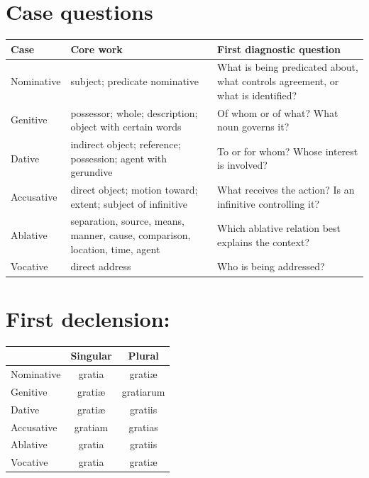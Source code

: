 \section{Case questions}



\begin{tabularx}{\linewidth}{@{}P{0.9in}P{1.7in}Y@{}}
  \toprule
  \textbf{Case} & \textbf{Core work} & \textbf{First diagnostic question} \\
  \midrule
  Nominative & subject; predicate nominative & What is being predicated about,
       what controls agreement, or what is identified? \\
  Genitive & possessor; whole; description; object with certain words & Of whom
             or of what? What noun governs it? \\
  Dative & indirect object; reference; possession; agent with gerundive & To or
           for whom? Whose interest is involved? \\
  Accusative & direct object; motion toward; extent; subject of infinitive &
               What receives the action? Is an infinitive controlling it? \\
  Ablative & separation, source, means, manner, cause, comparison, location,
             time, agent & Which ablative relation best explains the context? \\
  Vocative & direct address & Who is being addressed? \\
  \bottomrule
\end{tabularx}

\section{First declension: }

\begin{center}
\begin{tabular}{@{}lcc@{}}
  \toprule & \textbf{Singular} & \textbf{Plural} \\
  \midrule
  Nominative & gratia & gratiæ \\
  Genitive & gratiæ & gratiarum \\
  Dative & gratiæ & gratiis \\
  Accusative & gratiam & gratias \\
  Ablative & gratia & gratiis \\
  Vocative & gratia & gratiæ \\
  \bottomrule
\end{tabular}
\end{center}

